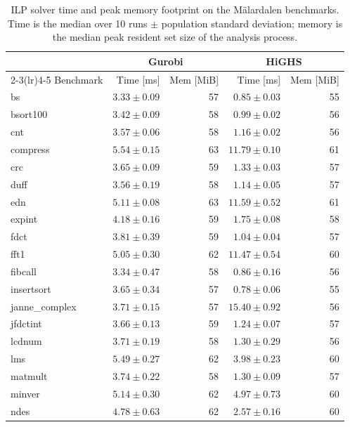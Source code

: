 \begin{table}[t]
  \centering
  \caption{ILP solver time and peak memory footprint on the M\"alardalen benchmarks. Time is the median over 10 runs $\pm$ population standard deviation; memory is the median peak resident set size of the analysis process.}
  \label{tab:ilp-solver-bench}
  \begin{tabular}{lrrrr}
    \toprule
    & \multicolumn{2}{c}{Gurobi} & \multicolumn{2}{c}{HiGHS} \\
    \cmidrule(lr){2-3}\cmidrule(lr){4-5}
    Benchmark & Time [ms] & Mem [MiB] & Time [ms] & Mem [MiB] \\
    \midrule
    bs & $3.33 \pm 0.09$ & 57 & $0.85 \pm 0.03$ & 55 \\
    bsort100 & $3.42 \pm 0.09$ & 58 & $0.99 \pm 0.02$ & 56 \\
    cnt & $3.57 \pm 0.06$ & 58 & $1.16 \pm 0.02$ & 56 \\
    compress & $5.54 \pm 0.15$ & 63 & $11.79 \pm 0.10$ & 61 \\
    crc & $3.65 \pm 0.09$ & 59 & $1.33 \pm 0.03$ & 57 \\
    duff & $3.56 \pm 0.19$ & 58 & $1.14 \pm 0.05$ & 57 \\
    edn & $5.11 \pm 0.08$ & 63 & $11.59 \pm 0.52$ & 61 \\
    expint & $4.18 \pm 0.16$ & 59 & $1.75 \pm 0.08$ & 58 \\
    fdct & $3.81 \pm 0.39$ & 59 & $1.04 \pm 0.04$ & 57 \\
    fft1 & $5.05 \pm 0.30$ & 62 & $11.47 \pm 0.54$ & 60 \\
    fibcall & $3.34 \pm 0.47$ & 58 & $0.86 \pm 0.16$ & 56 \\
    insertsort & $3.65 \pm 0.34$ & 57 & $0.78 \pm 0.06$ & 55 \\
    janne\_complex & $3.71 \pm 0.15$ & 57 & $15.40 \pm 0.92$ & 56 \\
    jfdctint & $3.66 \pm 0.13$ & 59 & $1.24 \pm 0.07$ & 57 \\
    lcdnum & $3.71 \pm 0.19$ & 58 & $1.30 \pm 0.29$ & 56 \\
    lms & $5.49 \pm 0.27$ & 62 & $3.98 \pm 0.23$ & 60 \\
    matmult & $3.74 \pm 0.22$ & 58 & $1.30 \pm 0.09$ & 57 \\
    minver & $5.14 \pm 0.30$ & 62 & $4.97 \pm 0.73$ & 60 \\
    ndes & $4.78 \pm 0.63$ & 62 & $2.57 \pm 0.16$ & 60 \\

\end{tabular}
\end{table}
